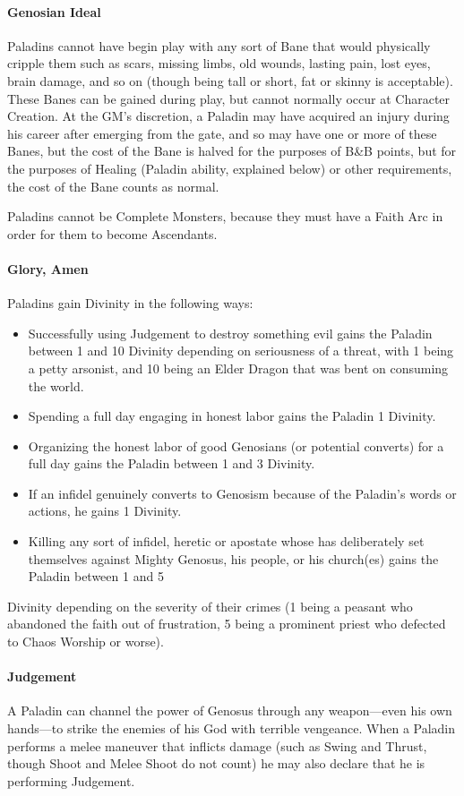 \documentclass[oneside,11pt,english]{book}
\begin{document}
\paragraph{Genosian Ideal}
Paladins cannot have begin play with any sort of Bane that would physically cripple them such as 
scars, missing limbs, old wounds, lasting pain, lost eyes, brain damage, and so on (though being 
tall or short, fat or skinny is acceptable). These Banes can be gained during play, but cannot 
normally occur at Character Creation. At the GM's discretion, a Paladin may have acquired an 
injury during his career after emerging from the gate, and so may have one or more of these 
Banes, but the cost of the Bane is halved for the purposes of B\&B points, but for the purposes of 
Healing (Paladin ability, explained below) or other requirements, the cost of the Bane counts as normal. 


Paladins cannot be Complete Monsters, because they must have a Faith Arc in order for them to become Ascendants. 
\paragraph{Glory, Amen}
Paladins gain Divinity in the following ways:
\begin{itemize}
\item Successfully using Judgement to destroy something evil gains the Paladin between 1 and 
10 Divinity depending on seriousness of a threat, with 1 being a petty arsonist, and 10 
being an Elder Dragon that was bent on consuming the world. 
\item Spending a full day engaging in honest labor gains the Paladin 1 Divinity. 
\item Organizing the honest labor of good Genosians (or potential converts) for a full day gains 
the Paladin between 1 and 3 Divinity. 
\item If an infidel genuinely converts to Genosism because of the Paladin's words or actions, he 
gains 1 Divinity. 
\item Killing any sort of infidel, heretic or apostate whose has deliberately set themselves 
against Mighty Genosus, his people, or his church(es) gains the Paladin between 1 and 5 
\end{itemize}
Divinity depending on the severity of their crimes (1 being a peasant who abandoned the faith out of frustration, 5 being a prominent priest who defected to Chaos Worship or worse).
\paragraph{Judgement}
A Paladin can channel the power of Genosus through any weapon—even his own hands—to strike the enemies of his God with terrible vengeance. When a Paladin performs a melee maneuver that inflicts damage (such as Swing and Thrust, though Shoot and Melee Shoot do not count) he may also declare that he is performing Judgement.\par
\end{document}
